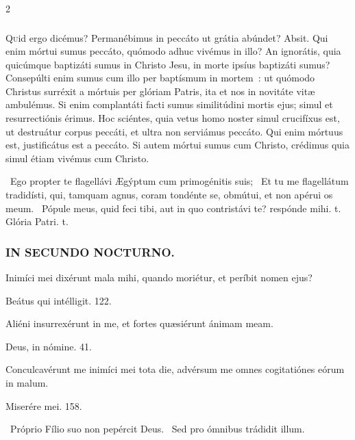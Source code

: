 \documentclass[9pt,twoside]{extarticle}
\begin{document}
\begin{multicols}{2}
{\subsubsection*{\center{}}
\lettrine{Q}uid ergo dicémus? Permanébimus in peccáto ut grátia abúndet? Absit. Qui enim mórtui sumus peccáto, quómodo adhuc vivémus in illo? An ignorátis, quia quicúmque baptizáti sumus in Christo Jesu, in morte ipsíus baptizáti sumus? Consepúlti enim sumus cum illo per baptísmum in mortem~: ut quómodo Christus surréxit a mórtuis per glóriam Patris, ita et nos in novitáte vitæ ambulémus. Si enim complantáti facti sumus similitúdini mortis ejus; simul et resurrectiónis érimus. Hoc sciéntes, quia vetus homo noster simul crucifíxus est, ut destruátur corpus peccáti, et ultra non serviámus peccáto. Qui enim mórtuus est, justificátus est a peccáto. Si autem mórtui sumus cum Christo, crédimus quia simul étiam vivémus cum Christo.

\begin{tightlist}{}
\item {}~Ego propter te flagellávi Ægýptum cum primogénitis suis; \textred{*}~Et tu me flagellátum tradidísti, qui, tamquam agnus, coram tondénte se, obmútui, et non apérui os meum. ~Pópule meus, quid feci tibi, aut in quo contristávi te? respónde mihi. t.  Glória Patri. t.
\end{tightlist}

\subsubsection*{\center \textsc{IN SECUNDO NOCTURNO.}}
\begin{tightlist}{}
\item {} Inimíci mei dixérunt mala mihi, quando moriétur, et períbit nomen ejus?
\item {} Beátus qui intélligit. 122.
\item {} Aliéni insurrexérunt in me, et fortes quæsiérunt ánimam meam.
\item {} Deus, in nómine. 41.
\item {} Conculcavérunt me inimíci mei tota die, advérsum me omnes cogitatiónes eórum in malum.
\item {} Miserére mei. 158.
\item {}~Próprio Fílio suo non pepércit Deus. ~Sed pro ómnibus trádidit illum.
\end{tightlist}

}
\end{multicols}
\end{document}
